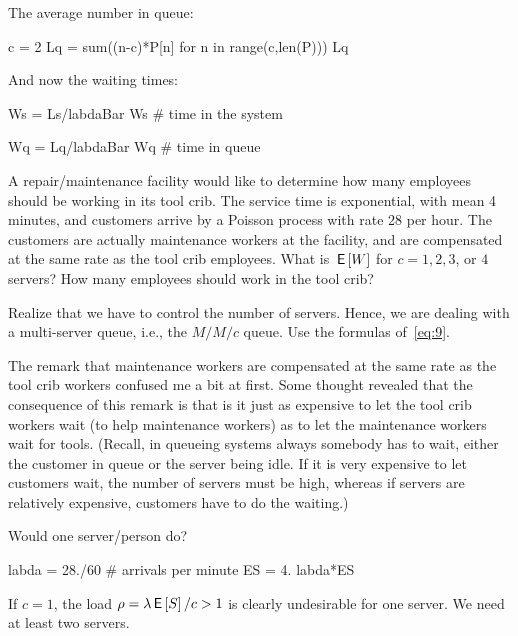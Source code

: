 \begin{extra}[Hall 5.8]
\begin{solution}
The average number in queue: 
\begin{pyconsole}
c = 2
Lq = sum((n-c)*P[n] for n in range(c,len(P)))
Lq
\end{pyconsole} 

And now the waiting times:

\begin{pyconsole}
Ws = Ls/labdaBar
Ws # time in the system

Wq = Lq/labdaBar
Wq # time in queue
\end{pyconsole} 

    \end{solution}
\end{extra}

\begin{exercise}[Hall 5.10] A repair/maintenance facility would like to determine how many employees should be working in its tool crib.
  The service time is exponential, with mean 4 minutes, and customers arrive by a Poisson process with rate 28 per hour.
  The customers are actually maintenance workers at the facility, and are compensated at the same rate as the tool crib employees.
  What is $\,\mathsf{E}\left[W\right]$ for $c=1, 2, 3$, or $4$ servers?
  How many employees should work in the tool crib?
  \begin{hint}
    Realize that we have to control the number of servers.
    Hence, we are dealing with a multi-server queue, i.e., the $M/M/c$ queue.
    Use the formulas of~\cref{eq:9}.

The remark that maintenance workers are compensated at the same rate
as the tool crib workers confused me a bit at first.  Some thought
revealed that the consequence of this remark is that is it just as
expensive to let the tool crib workers wait (to help maintenance
workers) as to let the maintenance workers wait for tools. (Recall, in
queueing systems always somebody has to wait, either the customer in queue or
the server being idle. If it is very expensive to let customers wait, the number
of servers must be high, whereas if servers are relatively expensive, customers have to do the waiting.)
  \end{hint}
  \begin{solution}

      Would one server/person do? 
\begin{pyconsole}
labda = 28./60 # arrivals per minute
ES = 4.
labda*ES
\end{pyconsole} 

If $c=1$, the load $\rho=\lambda \,\mathsf{E}\left[S\right]/c >1$ is clearly undesirable for one server.  We need at
least two servers.


\end{solution}
\end{exercise}
